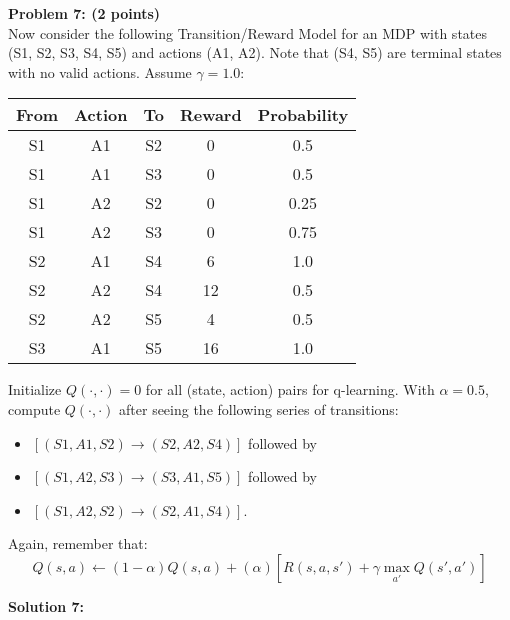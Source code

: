\documentclass[]{article}
\begin{document}
\clearpage
\textbf{Problem 7: (2 points)}\\
Now consider the following Transition/Reward Model for an MDP with states (S1, S2, S3, S4, S5) and actions (A1, A2). Note that (S4, S5) are terminal states with no valid actions. Assume $\gamma=1.0$:
\begin{table}[htb]
\centering
    \begin{tabular}{|c|c|c|c|c|}
      \hline
        From &	Action &	To &	Reward &	Probability \\\hline
        S1 &	A1 &	S2 &	0 &	0.5 \\\hline
        S1 &	A1 &	S3 &	0 &	0.5 \\\hline
        S1 &	A2 &	S2 &	0 &	0.25 \\\hline
        S1 &	A2 &	S3 &	0 &	0.75 \\\hline
        S2 &	A1 &	S4 &	6 &	1.0 \\\hline
        S2 &	A2 &	S4 &	12 &	0.5 \\\hline
        S2 &	A2 &	S5 &	4 &	0.5 \\\hline
        S3 &	A1 &	S5 &	16 &	1.0 \\\hline
    \end{tabular}
\end{table}
Initialize $Q(\cdot,\cdot) = 0$ for all (state, action) pairs for q-learning. With $\alpha = 0.5$, compute $Q(\cdot,\cdot)$ after seeing the following series of transitions:
\begin{itemize}
    \item $[(S1,A1,S2) \rightarrow (S2,A2,S4)]$ followed by
    \item $[(S1,A2,S3) \rightarrow (S3,A1,S5)]$ followed by
    \item $[(S1,A2,S2) \rightarrow (S2,A1,S4)]$.
\end{itemize}
Again, remember that: $$Q(s,a) \leftarrow (1-\alpha)Q(s,a) + (\alpha)[R(s,a,s') + \gamma \max_{a'}Q(s',a')]$$

\bigskip

\textbf{Solution 7:}
\end{document}
